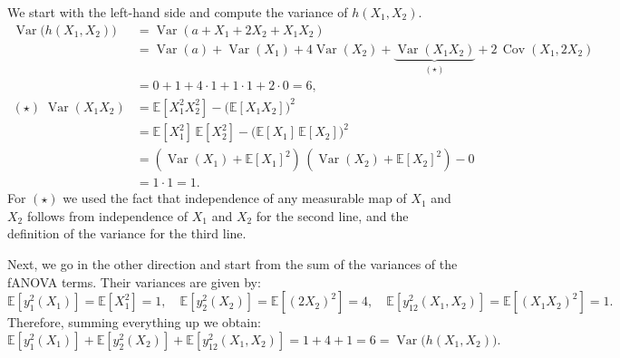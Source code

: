 We start with the left-hand side and compute the variance of $h(X_1,X_2)$.
\begin{align*}
\operatorname{Var}\big(h(X_1,X_2)\big)
&= \operatorname{Var}(a + X_1 + 2X_2 + X_1X_2) \\
&= \operatorname{Var}(a) + \operatorname{Var}(X_1) + 4\operatorname{Var}(X_2)
   + \underbrace{\operatorname{Var}(X_1X_2)}_{(\star)}
   + 2\,\operatorname{Cov}(X_1,2X_2) \\
&= 0 + 1 + 4 \cdot 1 + 1 \cdot 1 + 2\cdot 0 = 6, \\[0.3em]
(\star)\;\operatorname{Var}(X_1X_2)
&= \mathbb{E}[X_1^2 X_2^2] - \big(\mathbb{E}[X_1 X_2]\big)^2 \\
&=\mathbb{E}[X_1^2]\,\mathbb{E}[X_2^2]
   - \big(\mathbb{E}[X_1]\,\mathbb{E}[X_2]\big)^2 \\
&= (\operatorname{Var}(X_1)+\mathbb{E}[X_1]^2)\,
   (\operatorname{Var}(X_2)+\mathbb{E}[X_2]^2) - 0 \\
&= 1\cdot 1 = 1.
\end{align*}
For $(\star)$ we used the fact that independence of any measurable map of $X_1$ and $X_2$ follows from independence of $X_1$ and $X_2$ for the second line, and the definition of the variance for the third line.

Next, we go in the other direction and start from the sum of the variances of the fANOVA terms.
Their variances are given by:
\[
\mathbb{E}[y_1^2(X_1)] = \mathbb{E}[X_1^2] = 1,\quad
\mathbb{E}[y_2^2(X_2)] = \mathbb{E}[(2X_2)^2] = 4,\quad
\mathbb{E}[y_{12}^2(X_1,X_2)] = \mathbb{E}[(X_1 X_2)^2] = 1.
\]
Therefore, summing everything up we obtain:
\[
 \mathbb{E}[y_1^2(X_1)] + \mathbb{E}[y_2^2(X_2)] + \mathbb{E}[y_{12}^2(X_1,X_2)] 
 = 1 + 4 + 1 = 6
 = \operatorname{Var}\big(h(X_1,X_2)\big).
\]








